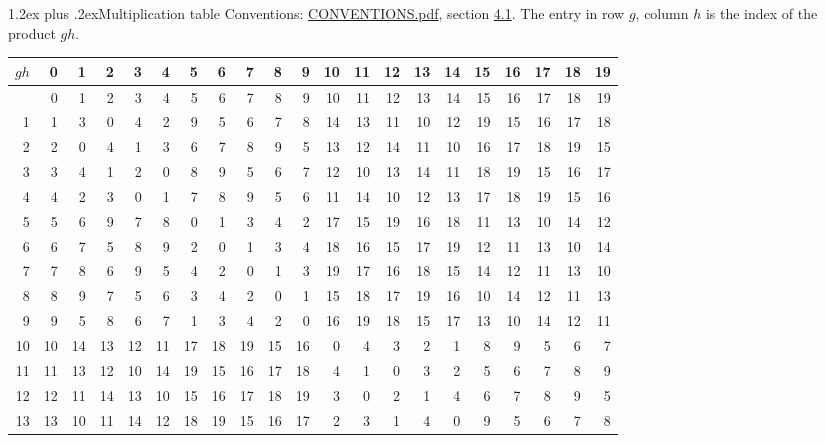 \documentclass[10pt,a4paper]{article}
\makeatletter
\renewcommand\section{\@startsection{section}{1}{\z@}{-3ex plus -1ex minus -.2ex}%
  {1.2ex plus .2ex}{\normalfont\large\sffamily\bfseries\color{parttitle}}}
\numberwithin{equation}{section}
\makeatother
\begin{document}
\section{Multiplication table}\label{s:multiplication}
Conventions: \href{../../CONVENTIONS.pdf}{CONVENTIONS.pdf}, section \href{../../CONVENTIONS.pdf\#conv.4.1}{4.1}.
The entry in row $g$, column $h$ is the index of the product $gh$.
{\normalsize\setlength{\tabcolsep}{0.1em}\setlength{\LTleft}{-8pt plus 1fill}\setlength{\LTright}{-8pt plus 1fill}\begin{longtable}{@{}r|rrrrrrrrrrrrrrrrrrrr@{}}\toprule
$gh$ & 0 & 1 & 2 & 3 & 4 & 5 & 6 & 7 & 8 & 9 & 10 & 11 & 12 & 13 & 14 & 15 & 16 & 17 & 18 & 19\\\midrule\endhead
\bottomrule\endfoot\endlastfoot
0 & 0 & 1 & 2 & 3 & 4 & 5 & 6 & 7 & 8 & 9 & 10 & 11 & 12 & 13 & 14 & 15 & 16 & 17 & 18 & 19\\*
1 & 1 & 3 & 0 & 4 & 2 & 9 & 5 & 6 & 7 & 8 & 14 & 13 & 11 & 10 & 12 & 19 & 15 & 16 & 17 & 18\\
2 & 2 & 0 & 4 & 1 & 3 & 6 & 7 & 8 & 9 & 5 & 13 & 12 & 14 & 11 & 10 & 16 & 17 & 18 & 19 & 15\\
3 & 3 & 4 & 1 & 2 & 0 & 8 & 9 & 5 & 6 & 7 & 12 & 10 & 13 & 14 & 11 & 18 & 19 & 15 & 16 & 17\\
4 & 4 & 2 & 3 & 0 & 1 & 7 & 8 & 9 & 5 & 6 & 11 & 14 & 10 & 12 & 13 & 17 & 18 & 19 & 15 & 16\\
5 & 5 & 6 & 9 & 7 & 8 & 0 & 1 & 3 & 4 & 2 & 17 & 15 & 19 & 16 & 18 & 11 & 13 & 10 & 14 & 12\\
6 & 6 & 7 & 5 & 8 & 9 & 2 & 0 & 1 & 3 & 4 & 18 & 16 & 15 & 17 & 19 & 12 & 11 & 13 & 10 & 14\\
7 & 7 & 8 & 6 & 9 & 5 & 4 & 2 & 0 & 1 & 3 & 19 & 17 & 16 & 18 & 15 & 14 & 12 & 11 & 13 & 10\\
8 & 8 & 9 & 7 & 5 & 6 & 3 & 4 & 2 & 0 & 1 & 15 & 18 & 17 & 19 & 16 & 10 & 14 & 12 & 11 & 13\\
9 & 9 & 5 & 8 & 6 & 7 & 1 & 3 & 4 & 2 & 0 & 16 & 19 & 18 & 15 & 17 & 13 & 10 & 14 & 12 & 11\\
10 & 10 & 14 & 13 & 12 & 11 & 17 & 18 & 19 & 15 & 16 & 0 & 4 & 3 & 2 & 1 & 8 & 9 & 5 & 6 & 7\\
11 & 11 & 13 & 12 & 10 & 14 & 19 & 15 & 16 & 17 & 18 & 4 & 1 & 0 & 3 & 2 & 5 & 6 & 7 & 8 & 9\\
12 & 12 & 11 & 14 & 13 & 10 & 15 & 16 & 17 & 18 & 19 & 3 & 0 & 2 & 1 & 4 & 6 & 7 & 8 & 9 & 5\\
13 & 13 & 10 & 11 & 14 & 12 & 18 & 19 & 15 & 16 & 17 & 2 & 3 & 1 & 4 & 0 & 9 & 5 & 6 & 7 & 8\\

\end{longtable}}
\end{document}
